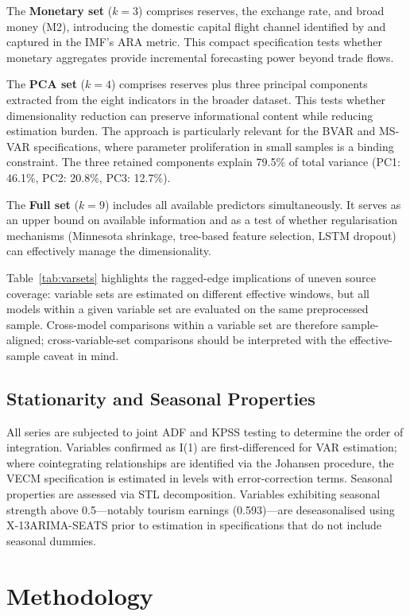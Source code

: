 \documentclass[12pt,a4paper]{article}
\begin{document}
The \textbf{Monetary set} ($k=3$) comprises reserves, the exchange rate, and broad money (M2), introducing the domestic capital flight channel identified by \cite{Obstfeld2010} and captured in the IMF's ARA metric. This compact specification tests whether monetary aggregates provide incremental forecasting power beyond trade flows.

The \textbf{PCA set} ($k=4$) comprises reserves plus three principal components extracted from the eight indicators in the broader dataset. This tests whether dimensionality reduction can preserve informational content while reducing estimation burden. The approach is particularly relevant for the BVAR and MS-VAR specifications, where parameter proliferation in small samples is a binding constraint. The three retained components explain 79.5\% of total variance (PC1: 46.1\%, PC2: 20.8\%, PC3: 12.7\%).

The \textbf{Full set} ($k=9$) includes all available predictors simultaneously. It serves as an upper bound on available information and as a test of whether regularisation mechanisms (Minnesota shrinkage, tree-based feature selection, LSTM dropout) can effectively manage the dimensionality.

Table~\ref{tab:varsets} highlights the ragged-edge implications of uneven source coverage: variable sets are estimated on different effective windows, but all models within a given variable set are evaluated on the same preprocessed sample. Cross-model comparisons within a variable set are therefore sample-aligned; cross-variable-set comparisons should be interpreted with the effective-sample caveat in mind.

\subsection{Stationarity and Seasonal Properties}

All series are subjected to joint ADF and KPSS testing to determine the order of integration. Variables confirmed as I(1) are first-differenced for VAR estimation; where cointegrating relationships are identified via the Johansen procedure, the VECM specification is estimated in levels with error-correction terms. Seasonal properties are assessed via STL decomposition. Variables exhibiting seasonal strength above 0.5---notably tourism earnings (0.593)---are deseasonalised using X-13ARIMA-SEATS prior to estimation in specifications that do not include seasonal dummies.

\section{Methodology}
\end{document}
